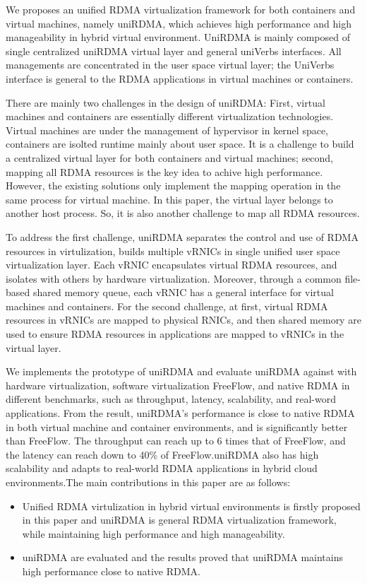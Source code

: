 We proposes an unified RDMA virtualization framework for both containers and virtual machines, namely uniRDMA, which achieves high performance and high manageability in hybrid virtual environment. UniRDMA is mainly composed of single centralized uniRDMA virtual layer and general uniVerbs interfaces. All managements are concentrated in the user space virtual layer; the UniVerbs interface is general to the RDMA applications in virtual machines or containers.

There are mainly two challenges in the design of uniRDMA: First, virtual machines and containers are essentially different virtualization technologies. Virtual machines are under the management of hypervisor in kernel space, containers are isolted runtime mainly about user space. It is a challenge to build a centralized virtual layer for both containers and virtual machines; second, mapping all RDMA resources is the key idea to achive high performance. However, the existing solutions only implement the mapping operation in the same process for virtual machine. In this paper, the virtual layer belongs to another host process. So, it is also another challenge to map all RDMA resources.

To address the first challenge, uniRDMA separates the control and use of RDMA resources in virtulization, builds multiple vRNICs in single unified user space virtualization layer. Each vRNIC encapsulates virtual RDMA resources, and isolates with others by hardware virtualization. Moreover, through a common file-based shared memory queue, each vRNIC has a general interface for virtual machines and containers. For the second challenge,  at first, virtual RDMA resources in vRNICs are mapped to physical RNICs, and then shared memory are used to ensure RDMA resources in applications are mapped to vRNICs in the virtual layer.

We implements the prototype of uniRDMA and evaluate uniRDMA against with hardware virtualization, software virtualization FreeFlow, and native RDMA in different benchmarks, such as throughput, latency, scalability, and real-word applications. From the result, uniRDMA's performance is close to native RDMA in both virtual machine and container environments, and is significantly better than FreeFlow. The throughput can reach up to 6 times that of FreeFlow, and the latency can reach down to 40\% of FreeFlow.uniRDMA also has high scalability and adapts to real-world RDMA applications in hybrid cloud environments.The main contributions in this paper are as follows:

\begin{itemize}
\item Unified RDMA virtulization in hybrid virtual environments is firstly proposed in this paper and uniRDMA is general RDMA virtualization framework,  while maintaining high performance and high manageability.

\item uniRDMA are evaluated and the results proved that uniRDMA maintains high performance close to native RDMA.
\end{itemize}

